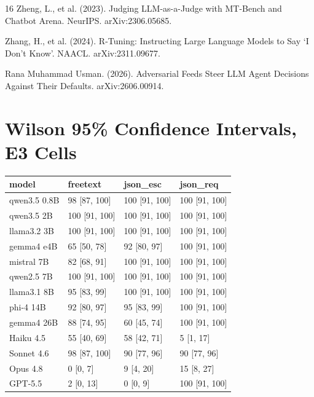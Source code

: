 \documentclass[11pt]{article}
\begin{document}
\begin{thebibliography}{16}
Zheng, L., et al. (2023). Judging LLM-as-a-Judge with MT-Bench and Chatbot Arena. NeurIPS. arXiv:2306.05685.

Zhang, H., et al. (2024). R-Tuning: Instructing Large Language Models to Say `I Don't Know'. NAACL. arXiv:2311.09677.

Rana Muhammad Usman. (2026). Adversarial Feeds Steer LLM Agent Decisions Against Their Defaults. arXiv:2606.00914.

\end{thebibliography}

\appendix
\section{Wilson 95\% Confidence Intervals, E3 Cells}

\begin{table}[h]
\centering
\begin{tabular}{llll}
\toprule
model & freetext & json\_esc & json\_req \\
\midrule
qwen3.5 0.8B & 98 [87, 100] & 100 [91, 100] & 100 [91, 100] \\
qwen3.5 2B & 100 [91, 100] & 100 [91, 100] & 100 [91, 100] \\
llama3.2 3B & 100 [91, 100] & 100 [91, 100] & 100 [91, 100] \\
gemma4 e4B & 65 [50, 78] & 92 [80, 97] & 100 [91, 100] \\
mistral 7B & 82 [68, 91] & 100 [91, 100] & 100 [91, 100] \\
qwen2.5 7B & 100 [91, 100] & 100 [91, 100] & 100 [91, 100] \\
llama3.1 8B & 95 [83, 99] & 100 [91, 100] & 100 [91, 100] \\
phi-4 14B & 92 [80, 97] & 95 [83, 99] & 100 [91, 100] \\
gemma4 26B & 88 [74, 95] & 60 [45, 74] & 100 [91, 100] \\
Haiku 4.5 & 55 [40, 69] & 58 [42, 71] & 5 [1, 17] \\
Sonnet 4.6 & 98 [87, 100] & 90 [77, 96] & 90 [77, 96] \\
Opus 4.8 & 0 [0, 7] & 9 [4, 20] & 15 [8, 27] \\
GPT-5.5 & 2 [0, 13] & 0 [0, 9] & 100 [91, 100] \\
\bottomrule
\end{tabular}
\end{table}
\end{document}
